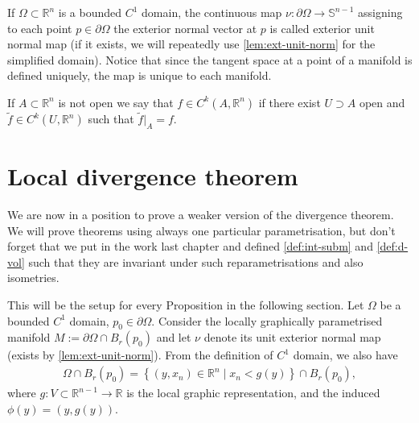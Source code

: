 \begin{definition}\label{def:ext-unit-map}
	If $\Omega \subset \mathbb{R}^n$ is a bounded $C^1$ domain, the continuous map $\nu: \partial \Omega \rightarrow \mathbb{S}^{n-1}$ assigning to each point $p \in \partial \Omega$ the exterior normal vector at $p$ is called exterior unit normal map (if it exists, we will repeatedly use \ref{lem:ext-unit-norm} for the simplified domain). Notice that since the tangent space at a point of a manifold is defined uniquely, the map is unique to each manifold.
\end{definition}

\begin{remark}
	If $A \subset \mathbb{R}^n$ is not open we say that $f \in C^k\left(A, \mathbb{R}^n\right)$ if there exist $U \supset A$ open and $\widetilde{f} \in C^k\left(U, \mathbb{R}^n\right)$ such that $\widetilde{f}|_{A}=f$.
\end{remark}

\newpage

\section{Local divergence theorem}

We are now in a position to prove a weaker version of the divergence theorem. We will prove theorems using always one particular parametrisation, but don't forget that we put in the work last chapter and defined \ref{def:int-subm} and \ref{def:d-vol} such that they are invariant under such reparametrisations and also isometries.

This will be the setup for every Proposition in the following section. Let $\Omega$ be a bounded $C^{1}$ domain, $p_{0} \in \partial \Omega$. Consider the locally graphically parametrised manifold $M := \partial \Omega \cap B_{r}(p_{0})$
and let $\nu$ denote its unit exterior normal map (exists by \ref{lem:ext-unit-norm}). From the definition of $C^{1}$ domain, we also have
\begin{align*}
	\Omega \cap B_{r}(p_{0}) = \left\{ (y, x_{n}) \in \mathbb{R}^{n} \mid x_{n} < g(y) \right\} \cap B_{r}(p_{0}),
\end{align*}
where $g: V \subset \mathbb{R}^{n-1} \to \mathbb{R}$ is the local graphic representation, and the induced $\phi(y) = (y, g(y))$.

